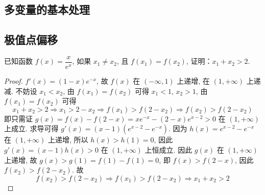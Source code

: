 
\begin{jie}
    
\end{jie}

\clearpage
\subsection{多变量的基本处理}
\clearpage
\subsection{极值点偏移}

\begin{example}[2010年天津理]
    已知函数 $f(x) = \dfrac{x}{e^x}$, 如果 $x_1 \neq x_2$, 且 $f(x_1) = f(x_2)$, 证明：$x_1 + x_2 > 2$. 
\end{example}

\begin{proof}
    $f'(x) = (1-x)e^{-x}$, 故 $f(x)$ 在 $(-\infty, 1)$ 上递增, 在 $(1, +\infty)$ 上递减. 不妨设 $x_1 < x_2$, 由 $f(x_1) = f(x_2)$ 可得 $x_1 < 1$, $x_2 > 1$, 由 $f(x_1) = f(x_2)$ 可得
    \[
    x_1 + x_2 > 2 \Rightarrow x_1 > 2 - x_2 \Rightarrow f(x_1) > f(2 - x_2) \Rightarrow f(x_2) > f(2 - x_2)
    \]
    即只需证 $g(x) = f(x) - f(2-x) = xe^{-x} - (2-x)e^{x-2} > 0$ 在 $(1, +\infty)$ 上成立. 求导可得 $g'(x) = (x-1)(e^{x-2} - e^{-x})$. 因为 $h(x) = e^{x-2} - e^{-x}$ 在 $(1, +\infty)$ 上递增, 所以 $h(x) > h(1) = 0$, 因此 $g'(x) = (x-1)h(x) > 0$ 在 $(1, +\infty)$ 上恒成立. 因此 $g(x)$ 在 $(1, +\infty)$ 上递增, 故 $g(x) > g(1) = f(1) - f(1) = 0$, 即 $f(x) > f(2-x)$, 因此 $f(x_2) > f(2-x_2)$. 故
    \[
    f(x_2) > f(2 - x_2) \Rightarrow f(x_1) > f(2 - x_2) \Rightarrow x_1 + x_2 > 2
    \]
    
\end{proof}


